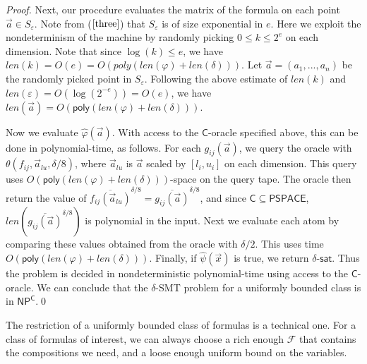 \documentclass[envcountsect]{llncs}
\newcommand{\len}{\mathit{len}}
\newcommand{\poly}{\mathsf{poly}}
\begin{document}
\begin{proof}
Next, our procedure evaluates the matrix of the formula on each point $\vec a\in S_{\varepsilon}$. Note from ($\ref{three}$) that $S_{\varepsilon}$ is of size exponential in $e$. Here we exploit the nondeterminism of the machine by randomly picking $0\leq k\leq 2^e$ on each dimension. Note that since $\log(k)\leq e$, we have $\len(k) = O(e) = O(poly(\len(\varphi)+\len(\delta)))$. Let $\vec a = (a_1,...,a_n)$ be the randomly picked point in $S_{\varepsilon}$. Following the above estimate of $\len(k)$ and $\len(\varepsilon) = O(\log(2^{-e}))= O(e)$, we have $\len(\vec a) = O(\poly(\len(\varphi)+\len(\delta)))$. 

Now we evaluate $\widehat{\varphi}(\vec a)$. With access to the $\mathsf{C}$-oracle specified above, this can be done in polynomial-time, as follows. For each $g_{ij}(\vec a)$, we query the oracle with $\theta(f_{ij}, \vec a_{lu}, \delta/8)$, where $\vec a_{lu}$ is $\vec a$ scaled by $[l_i, u_i]$ on each dimension. This query uses $O(\poly(\len(\varphi)+\len(\delta)))$-space on the query tape. The oracle then return the value of $\overline{f_{ij}(\vec a_{lu})}^{\delta/8}= \overline{g_{ij}(\vec a)}^{\delta/8}$, and since $\mathsf{C}\subseteq \mathsf{PSPACE}$, $\len(\overline{g_{ij}(\vec a)}^{\delta/8})$ is polynomial in the input. Next we evaluate each atom by comparing these values obtained from the oracle with $\delta/2$. This uses time $O(\poly(\len(\varphi)+\len(\delta)))$. Finally, if $\widehat{\psi}(\vec x)$ is true, we return $\delta$-$\mathsf{sat}$. Thus the problem is decided in nondeterministic polynomial-time using access to the $\mathsf{C}$-oracle. We can conclude that the $\delta$-SMT problem for a uniformly bounded class is in $\mathsf{NP^C}$.\qed
\end{proof}
\begin{remark}
The restriction of a uniformly bounded class of formulas is a technical one. For a class of formulas of interest, we can always choose a rich enough $\mathcal{F}$ that contains the compositions we need, and a loose enough uniform bound on the variables. 
\end{remark}
\end{document}
